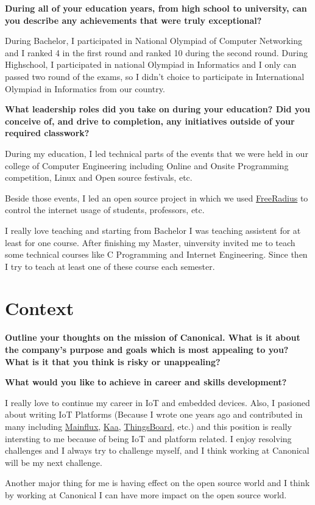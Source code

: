 \noindent
\textbf{During all of your education years, from high school to university, can you describe any achievements that were truly exceptional?}

During Bachelor, I participated in National Olympiad of Computer Networking and I ranked 4 in the first round and ranked
10 during the second round.
During Highschool, I participated in national Olympiad in Informatics and I only can passed two round of the exams, so
I didn't choice to participate in International Olympiad in Informatics from our country.

\noindent
\textbf{What leadership roles did you take on during your education?
Did you conceive of, and drive to completion, any initiatives outside of your required classwork?}

During my education, I led technical parts of the events that we were held in our college of Computer Engineering including
Online and Onsite Programming competition, Linux and Open source festivals, etc.

Beside those events, I led an open source project in which we used \href{https://freeradius.org/}{FreeRadius}
to control the internet usage of students, professors, etc.

I really love teaching and starting from Bachelor I was teaching assistent for at least for one course.
After finishing my Master, uinversity invited me to teach some technical courses like C Programming and
Internet Engineering. Since then I try to teach at least one of these course each semester.

\section{Context}

\noindent
\textbf{Outline your thoughts on the mission of Canonical. What is it about the company's purpose and goals which is most appealing to you? What is it that you think is risky or unappealing?}

\noindent
\textbf{What would you like to achieve in career and skills development?}

I really love to continue my career in IoT and embedded devices. Also, I pasioned about writing IoT Platforms
(Because I wrote one years ago and contributed in many including \href{https://github.com/mainflux}{Mainflux},
\href{https://github.com/kaaproject}{Kaa}, \href{https://github.com/thingsboard}{ThingsBoard}, etc.)
and this position is really intersting to me because of being IoT and platform related.
I enjoy resolving challenges and I always try to challenge myself, and I think working at Canonical will be my next challenge.

Another major thing for me is having effect on the open source world and I think by working at Canonical I can
have more impact on the open source world.
